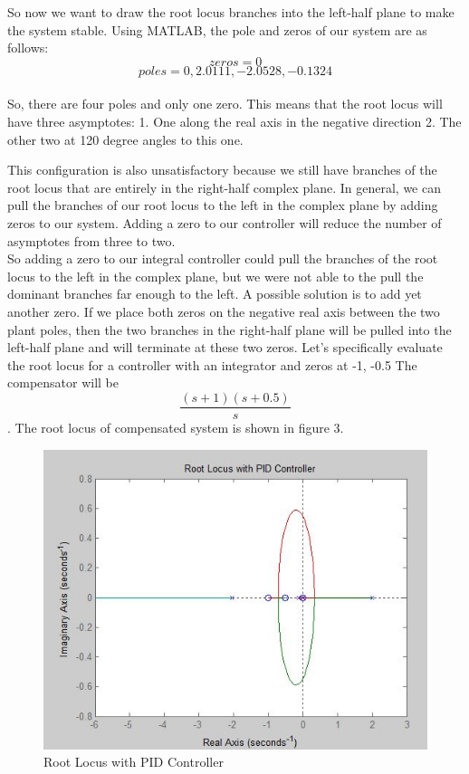 \documentclass{article}
\begin{document}
So now we want to draw the root locus branches into the left-half plane to make the system stable. 
Using MATLAB, the pole and zeros of our system are as follows:
\[zeros = 0\]
\[poles = 0, 2.0111, -2.0528, -0.1324 \]
\\
So, there are four poles and only one zero. This means that the root locus will have three asymptotes: 
1. One along the real axis in the negative direction
2. The other two at 120 degree angles to this one.

This configuration is also unsatisfactory because we still have branches of the root locus that are entirely in the right-half complex plane. In general, we can pull the branches of our root locus to the left in the complex plane by adding zeros to our system. Adding a zero to our controller will reduce the number of asymptotes from three to two.
\\
So adding a zero to our integral controller could pull the branches of the root locus to the left in the complex plane, but we were not able to the pull the dominant branches far enough to the left. A possible solution is to add yet another zero. If we place both zeros on the negative real axis between the two plant poles, then the two branches in the right-half plane will be pulled into the left-half plane and will terminate at these two zeros. Let's specifically evaluate the root locus for a controller with an integrator and zeros at -1, -0.5 The compensator will be \[\frac{(s+1)(s+0.5)}{s}\]. The root locus of compensated system is shown in figure 3.
\begin{figure}[h]
  \includegraphics[width=\linewidth]{fig3.JPG}
  \caption{Root Locus with PID Controller}
  \label{fig:boat1}
\end{figure}
\end{document}
